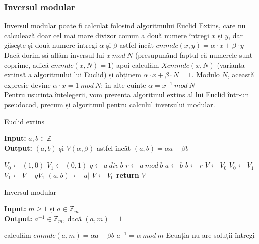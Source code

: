 \documentclass[12pt, oneside]{book}
\begin{document}
       \subsubsection{Inversul modular}
         Inversul modular poate fi calculat folosind algoritmului Euclid Extins, care nu calculează doar cel mai mare divizor comun a două numere întregi $x$ și $y$, dar găsește și două numere întregi $ \alpha $ și $  \beta $ astfel încât $ cmmdc(x,y) = \alpha \cdot   x + \beta \cdot   y$ \\
        Dacă dorim să aflăm inversul lui  $x \ mod \ N$ (presupunând faptul că numerele sunt coprime, adică $cmmdc(x,N)=1)$ apoi calculăm $Xcmmdc(x,N)$ (varianta extinsă a algoritmului lui Euclid) și obținem $ \alpha \cdot   x + \beta \cdot   N = 1$. Modulo $N$, această expresie devine $\alpha \cdot   x  = 1 \ mod \ N$; în alte cuinte $\alpha= x^{-1} \ mod \ N$ \\
        Pentru ușurința înțelegerii, vom prezenta algoritmul extins al lui Euclid într-un pseudocod, precum și algoritmul pentru calculul inversului modular.  
        \begin{algorithm}[H]
		   \caption{Euclid extins}
		   \textbf{Input:} $a,b \in \mathbb{Z}$ \\
		   \textbf{Output:} $(a,b)$ și $V(\alpha, \beta)$ astfel încât $(a,b) = \alpha a + \beta b$
		   \begin{algorithmic}
		   \State $V_0 \gets (1,0)$
		   \State $V_1 \gets (0,1)$
		    \State $q \gets a  \ div \ b$
		    \State $r \gets a \ mod  \ b$
		    \State $a \gets b$
		    \State $b \gets r$
		    \State $V \gets V_0$
		    \State $V_0 \gets V_1$
		    \State $V_1 \gets V - qV_1$
		   \EndWhile
		   \State $(a,b) \ \gets \left| a \right|$
		   \State $V \gets V_0$
		   \State \textbf{return} $V$
		   \end{algorithmic}
		   \end{algorithm}
		   
		   
		   \begin{algorithm}[H]
		   \caption{Inversul modular}
		   \textbf{Input:} $ m \geq 1$ și $ a \in \mathbb{Z}_m$ \\
		   \textbf{Output:} $ a^{-1} \in \mathbb{Z}_m$, dacă $(a,m)=1$
		   \begin{algorithmic}
		   \State calculăm $cmmdc(a,m)= \alpha a + \beta b$
		   \If{ $ cmmdc(a,m)=1 $ }
		   \State $ a^{-1} = \alpha \ mod \ m$
		   \Else
    		\State Ecuația nu are soluții întregi 
		   \EndIf
		   \end{algorithmic}
		   \end{algorithm}
        
\end{document}
